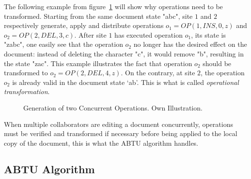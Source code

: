 \documentclass[11pt, a4paper, oneside, openright]{article} %
\begin{document}
The following example from figure~\ref{fig:concurrentOp}  will show why operations need to be transformed. Starting from the same document state "abc", site $1$ and $2$ respectively generate, apply and distribute operations $o_1 = OP(1, INS, 0, z)$ and $o_2= OP(2, DEL, 3, c)$. After site $1$ has executed operation $o_1$, its state is "zabc", one easily see that the operation $o_2$ no longer has the desired effect on the document: instead of deleting the character "c", it would remove "b", resulting in the state "zac". This example illustrates the fact that operation $o_2$ should be transformed to $o_2 = OP(2, DEL, 4, z)$. On the contrary, at site $2$, the operation $o_2$ is already valid in the document state ‘ab’. This is what is called \textit{operational transformation}.


\begin{figure}[h]
\begin{center}
\end{center}
\caption{Generation of two Concurrent Operations. Own Illustration.\label{fig:concurrentOp}}
\end{figure}

When multiple collaborators are editing a document concurrently, operations must be verified and transformed if necessary before being applied to the local copy of the document, this is what the ABTU algorithm handles.

\subsection{ABTU Algorithm}
\label{subsec:abtu}
\end{document}
